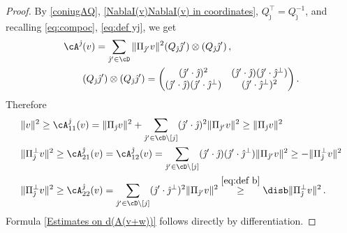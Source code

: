 \documentclass[11pt,a4paper,reqno]{article}
\numberwithin{equation}{section}
\theoremstyle{definition}
\begin{document}
\begin{proof} 
By \eqref{coniugAQ},
\eqref{NablaI(v)NablaI(v) in coordinates}, 
$ Q_{\hat \jmath}^\top = Q_{\hat \jmath}^{-1} $,  
and recalling \eqref{eq:compoc}, \eqref{eq:def yj},
we get 
   \begin{align*}
                \cA^{\hat \jmath}& (v) 
                 = \sum_{{\hat \jmath'} \in \cD} \|\Pi_{\hat \jmath'}  v\|^2 (Q_{\hat \jmath} \hat\jmath')\otimes (Q_{\hat \jmath} \hat\jmath')
                 \, , \\
 &(Q_{\hat \jmath} \hat\jmath')\otimes(Q_{\hat \jmath} \hat\jmath')=\begin{pmatrix}(\hat\jmath'\cdot\hat\jmath)^2 & (\hat\jmath'\cdot\hat\jmath)(\hat\jmath'\cdot\hat\jmath^\bot)\\  (\hat\jmath'\cdot\hat\jmath)(\hat\jmath'\cdot\hat\jmath^\bot) & (\hat\jmath'\cdot\hat\jmath^\bot)^2  
        \end{pmatrix}.      
            \end{align*} 
    Therefore 
    \begin{align*}
       &      \|v\|^2\geq \cA^{\hat \jmath}_{11}(v)=
       \|\Pi_{\hat \jmath} v\|^2 + \sum_{{\hat \jmath'} \in \cD\setminus [j]}  (\hat\jmath'\cdot  \hat\jmath)^2 \|\Pi_{\hat \jmath'} v\|^2 \geq \|\Pi_{\hat \jmath} v\|^2 \\
        & 
            \|\Pi_{\hat \jmath}^\bot v\|^2\geq \cA^{\hat \jmath}_{21}(v)=\cA^{\hat \jmath}_{12}(v)=\sum_{{\hat \jmath'} \in \cD\setminus [j]}  (\hat\jmath'\cdot  \hat\jmath)(\hat\jmath'\cdot  \hat\jmath^\bot) \|\Pi_{\hat \jmath'} v\|^2\geq -\|\Pi_{\hat \jmath}^\bot v\|^2 \\
& 
            \|\Pi_{\hat \jmath}^\bot v\|^2\geq \cA^{\hat \jmath}_{22}(v)=\sum_{{\hat \jmath'} \in \cD\setminus [j]}  (\hat\jmath'\cdot  \hat\jmath^\bot)^2 \|\Pi_{\hat \jmath'} v\|^2 \stackrel{\eqref{eq:def b}} 
            \geq \disb \|\Pi_{\hat \jmath}^\bot v\|^2 \, . 
\end{align*}
    Formula  \eqref{Estimates on d(A(v+w))} follows directly 
    by differentiation.
\end{proof}
\end{document}
